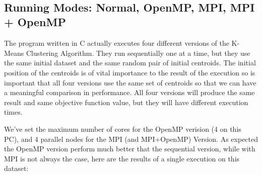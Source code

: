 \documentclass[11pt]{article}
\begin{document}
    \begin{center}
    \end{center}
    { \hspace*{\fill} \\}
    
    \hypertarget{running-modes-normal-openmp-mpi-mpi-openmp}{%
\subsection{Running Modes: Normal, OpenMP, MPI, MPI +
OpenMP}\label{running-modes-normal-openmp-mpi-mpi-openmp}}

    The program written in C actually executes four different versions of
the K-Means Clustering Algorithm. They run sequentially one at a time,
but they use the same initial dataset and the same random pair of
initial centroids. The initial position of the centroids is of vital
importance to the result of the execution so is important that all four
versions use the same set of centroids so that we can have a meaningful
comparison in performance. All four versions will produce the same
result and same objective function value, but they will have different
execution times.

We've set the maximum number of cores for the OpenMP verision (4 on this
PC), and 4 parallel nodes for the MPI (and MPI+OpenMP) Version. As
expected the OpenMP version perform much better that the sequential
version, while with MPI is not always the case, here are the results of
a single execution on this dataset:
\end{document}
